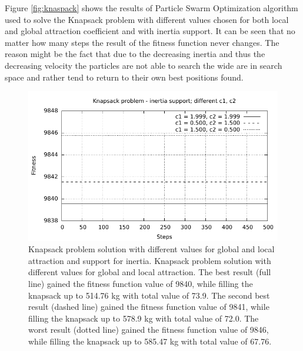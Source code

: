 Figure \ref{fig:knaspack} shows the results of Particle Swarm Optimization algorithm used to solve the Knapsack problem with different values chosen for both local and global attraction coefficient and with inertia support. It can be seen that no matter how many steps the result of the fitness function never changes. The reason might be the fact that due to the decreasing inertia and thus the decreasing velocity the particles are not able to search the wide are in search space and rather tend to return to their own best positions found.

\begin{figure}[!h]
	\centering
		\includegraphics[width=15cm]{img/3c.pdf}
	\caption{Knapsack problem solution with different values for global and local attraction and support for inertia. Knapsack problem solution with different values for global and local attraction. The best result (full line) gained the fitness function value of 9840, while filling the knapsack up to 514.76 kg with total value of 73.9. The second best result (dashed line) gained the fitness function value of 9841, while filling the knapsack up to 578.9 kg with total value of 72.0. The worst result (dotted line) gained the fitness function value of 9846, while filling the knapsack up to 585.47 kg with total value of 67.76.}
	\label{fig:knaspack_inertia}
\end{figure}